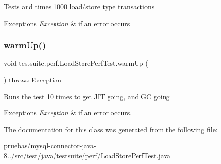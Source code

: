 Tests and times 1000 load/store type transactions


\begin{DoxyExceptions}{Exceptions}
{\em Exception} & if an error occurs \\
\hline
\end{DoxyExceptions}
\mbox{\label{classtestsuite_1_1perf_1_1_load_store_perf_test_aedfa3a61f8e71a59e738a6b6e9d27d0e}} 
\subsubsection{\texorpdfstring{warm\+Up()}{warmUp()}}
{\footnotesize\ttfamily void testsuite.\+perf.\+Load\+Store\+Perf\+Test.\+warm\+Up (\begin{DoxyParamCaption}{ }\end{DoxyParamCaption}) throws Exception\hspace{0.3cm}{\ttfamily [protected]}}

Runs the test 10 times to get J\+IT going, and GC going


\begin{DoxyExceptions}{Exceptions}
{\em Exception} & if an error occurs. \\
\hline
\end{DoxyExceptions}


The documentation for this class was generated from the following file\+:\begin{DoxyCompactItemize}
\item 
pruebas/mysql-\/connector-\/java-\/8../src/test/java/testsuite/perf/\mbox{\hyperlink{_load_store_perf_test_8java}{Load\+Store\+Perf\+Test.\+java}}\end{DoxyCompactItemize}
